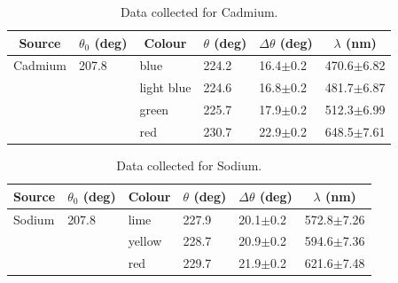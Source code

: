 \documentclass[justified]{tufte-book}
\begin{document}
\begin{enumerate}
\begin{table}[ht]
\center
\begin{tabular}{|l|l|l|l|l|l|}
\hline
\multicolumn{1}{|c|}{Source} & \multicolumn{1}{c|}{$\theta_0$ (deg)} & \multicolumn{1}{c|}{Colour} & \multicolumn{1}{c|}{$\theta$ (deg)} & \multicolumn{1}{c|}{$\Delta\theta$ (deg)} & \multicolumn{1}{c|}{$\lambda$ (nm)} \\ \hline
Cadmium                                  & 207.8                                 & blue                        & 224.2                               & 16.4$\pm$0.2                              & 470.6$\pm$6.82                      \\ \hline
                                         &                                       & light blue                  & 224.6                               & 16.8$\pm$0.2                              & 481.7$\pm$6.87                      \\ \hline
                                         &                                       & green                       & 225.7                               & 17.9$\pm$0.2                              & 512.3$\pm$6.99                      \\ \hline
                                         &                                       & red                         & 230.7                               & 22.9$\pm$0.2                              & 648.5$\pm$7.61                      \\ \hline
\end{tabular}
\caption{Data collected for Cadmium.}
\label{tab:spcg4}
\end{table}


\begin{table}[ht]
\center
\begin{tabular}{|l|l|l|l|l|l|}
\hline
\multicolumn{1}{|c|}{Source} & \multicolumn{1}{c|}{$\theta_0$ (deg)} & \multicolumn{1}{c|}{Colour} & \multicolumn{1}{c|}{$\theta$ (deg)} & \multicolumn{1}{c|}{$\Delta\theta$ (deg)} & \multicolumn{1}{c|}{$\lambda$ (nm)} \\ \hline
Sodium                                   & 207.8                                 & lime                        & 227.9                               & 20.1$\pm$0.2                              & 572.8$\pm$7.26                      \\ \hline
                                         &                                       & yellow                      & 228.7                               & 20.9$\pm$0.2                              & 594.6$\pm$7.36                      \\ \hline
                                         &                                       & red                         & 229.7                               & 21.9$\pm$0.2                              & 621.6$\pm$7.48                      \\ \hline
\end{tabular}
\caption{Data collected for Sodium.}
\label{tab:spcg5}
\end{table}


\end{enumerate}
\end{document}
